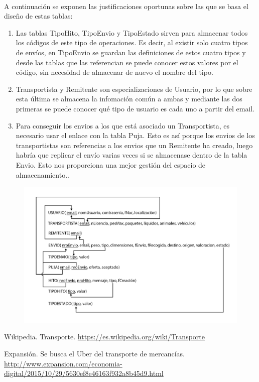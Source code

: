 \documentclass[10pt, a4paper,spanish]{article}
\begin{document}
		\paragraph{}
		A continuación se exponen las justificaciones oportunas sobre las que se basa el diseño de estas tablas:
		\begin{enumerate}
			\item Las tablas TipoHito, TipoEnvio y TipoEstado sirven para almacenar todos los códigos de este tipo de operaciones. Es decir, al existir solo cuatro tipos de envíos, en TipoEnvio se guardan las definiciones de estos cuatro tipos y desde las tablas que las referencian se puede conocer estos valores por el código, sin necesidad de almacenar de nuevo el nombre del tipo.
			\item Transportista y Remitente son especializaciones de Usuario, por lo que sobre esta última se almacena la infomación común a ambas y mediante las dos primeras se puede conocer qué tipo de usuario es cada uno a partir del email.
			\item Para conseguir los envios a los que está asociado un Transportista, es necesario usar el enlace con la tabla Puja. Esto es así porque los envios de los transportistas son referencias a los envios que un Remitente ha creado, luego habría que replicar el envío varias veces si se almacenase dentro de la tabla Envio. Esto nos proporciona una mejor gestión del espacio de almacenamiento..
		\end{enumerate}

		\begin{figure}[H]
			\centering
				\includegraphics[width=1\textwidth]{res/database.png}
		\end{figure}
	\begin{thebibliography}{9}

		Wikipedia. Transporte. \url{https://es.wikipedia.org/wiki/Transporte}

		Expansión. Se busca el Uber del transporte de mercancías. \url{http://www.expansion.com/economia-digital/2015/10/29/5630ef8e46163f932a8b45d9.html}

	\end{thebibliography}
\end{document}

